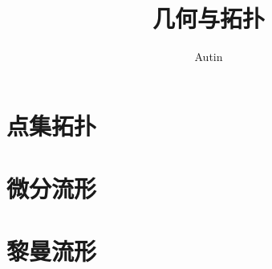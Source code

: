 \documentclass[lang=cn,10pt,color=blue,pad]{elegantbook}
\title{几何与拓扑}
\author{Autin}
\begin{document}
\maketitle

\frontmatter

\tableofcontents

\mainmatter

\part{点集拓扑}



\part{微分流形}















\part{黎曼流形}




















                                    

\end{document}
